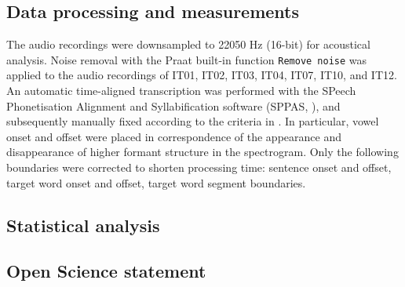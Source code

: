 \documentclass[12pt,]{article}
\begin{document}
\subsection{Data processing and
measurements}\label{data-processing-and-measurements}

The audio recordings were downsampled to 22050 Hz (16-bit) for
acoustical analysis. Noise removal with the Praat built-in function
\texttt{Remove\ noise} \citep{boersma2018} was applied to the audio
recordings of IT01, IT02, IT03, IT04, IT07, IT10, and IT12. An automatic
time-aligned transcription was performed with the SPeech Phonetisation
Alignment and Syllabification software (SPPAS, \citealt{bigi2015}), and
subsequently manually fixed according to the criteria in
\citet{machac2009}. In particular, vowel onset and offset were placed in
correspondence of the appearance and disappearance of higher formant
structure in the spectrogram. Only the following boundaries were
corrected to shorten processing time: sentence onset and offset, target
word onset and offset, target word segment boundaries.

\subsection{Statistical analysis}\label{statistical-analysis}

\subsection{Open Science statement}\label{open-science-statement}


\end{document}

